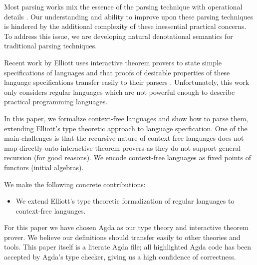 Most parsing works mix the essence of the parsing technique with operational details . Our understanding and ability to improve upon these parsing techniques is hindered by the additional complexity of these inessential practical concerns. To address this issue, we are developing natural denotational semantics for traditional parsing techniques.

Recent work by Elliott uses interactive theorem provers to state simple specifications of languages and that proofs of desirable properties of these language specifications transfer easily to their parsers \cite{conal-languages}. Unfortunately, this work only considers regular languages which are not powerful enough to describe practical programming languages.


In this paper, we formalize context-free languages and show how to parse them, extending Elliott’s type theoretic approach to language specfication.  One of the main challenges is that the recursive nature of context-free languages does not map directly onto interactive theorem provers as they do not support general recursion (for good reasons). We encode context-free languages as fixed points of functors (initial algebras).


We make the following concrete contributions:
\begin{itemize}
\item We extend Elliott's type theoretic formalization of regular languages to context-free languages.
\end{itemize}

For this paper we have chosen Agda as our type theory and interactive theorem prover. We believe our definitions should transfer easily to other theories and tools. This paper itself is a literate Agda file; all highlighted Agda code has been accepted by Agda's type checker, giving us a high confidence of correctness.






